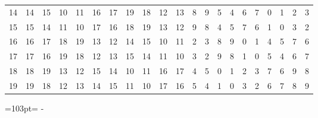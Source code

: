 \documentclass[10pt,a4paper]{article}
\newcommand{\needspace}[1]{\par\penalty-100\begingroup\dimen0=#1\relax\dimen2=\pagegoal
  \advance\dimen2-\pagetotal\ifdim\dimen0>\dimen2\relax\ifdim\dimen2>0pt\vfil\break\fi\fi
  \endgroup}
\numberwithin{equation}{section}
\begin{document}
{\begin{longtable}{@{}r|rrrrrrrrrrrrrrrrrrrr@{}}
14 & 14 & 15 & 10 & 11 & 16 & 17 & 19 & 18 & 12 & 13 & 8 & 9 & 5 & 4 & 6 & 7 & 0 & 1 & 2 & 3\\
15 & 15 & 14 & 11 & 10 & 17 & 16 & 18 & 19 & 13 & 12 & 9 & 8 & 4 & 5 & 7 & 6 & 1 & 0 & 3 & 2\\
16 & 16 & 17 & 18 & 19 & 13 & 12 & 14 & 15 & 10 & 11 & 2 & 3 & 8 & 9 & 0 & 1 & 4 & 5 & 7 & 6\\
17 & 17 & 16 & 19 & 18 & 12 & 13 & 15 & 14 & 11 & 10 & 3 & 2 & 9 & 8 & 1 & 0 & 5 & 4 & 6 & 7\\
18 & 18 & 19 & 13 & 12 & 15 & 14 & 10 & 11 & 16 & 17 & 4 & 5 & 0 & 1 & 2 & 3 & 7 & 6 & 9 & 8\\*
19 & 19 & 18 & 12 & 13 & 14 & 15 & 11 & 10 & 17 & 16 & 5 & 4 & 1 & 0 & 3 & 2 & 6 & 7 & 8 & 9\\
\bottomrule\end{longtable}}
\needspace{103pt}
\end{document}
